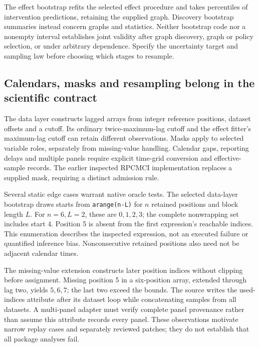 The effect bootstrap refits the selected effect procedure and takes percentiles of intervention predictions, retaining the supplied graph. Discovery bootstrap summaries instead concern graphs and statistics. Neither bootstrap code nor a nonempty interval establishes joint validity after graph discovery, graph or policy selection, or under arbitrary dependence. Specify the uncertainty target and sampling law before choosing which stages to resample. \citep{exec23_tigramite_reuse_source}

\subsection{Calendars, masks and resampling belong in the scientific contract}
\label{exec23:tigramite-calendar}
The data layer constructs lagged arrays from integer reference positions, dataset offsets and a cutoff. Its ordinary twice-maximum-lag cutoff and the effect fitter's maximum-lag cutoff can retain different observations. Masks apply to selected variable roles, separately from missing-value handling. Calendar gaps, reporting delays and multiple panels require explicit time-grid conversion and effective-sample records. The earlier inspected RPCMCI implementation replaces a supplied mask, requiring a distinct admission rule. \citep{exec23_tigramite_reuse_source}

Several static edge cases warrant native oracle tests. The selected data-layer bootstrap draws starts from \texttt{arange(n-L)} for $n$ retained positions and block length $L$. For $n=6,L=2$, these are $0,1,2,3$; the complete nonwrapping set includes start 4. Position 5 is absent from the first expression's reachable indices. This enumeration describes the inspected expression, not an executed failure or quantified inference bias. Nonconsecutive retained positions also need not be adjacent calendar times. \citep{exec23_tigramite_reuse_source,exec23_tigramite_reference}

The missing-value extension constructs later position indices without clipping before assignment. Missing position 5 in a six-position array, extended through lag two, yields $5,6,7$; the last two exceed the bounds. The source writes the used-indices attribute after its dataset loop while concatenating samples from all datasets. A multi-panel adapter must verify complete panel provenance rather than assume this attribute records every panel. These observations motivate narrow replay cases and separately reviewed patches; they do not establish that all package analyses fail. \citep{exec23_tigramite_reuse_source,exec23_tigramite_reference}

